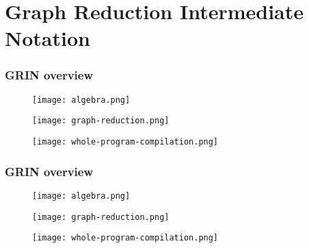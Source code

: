 \documentclass[bigger,aspectratio=169]{beamer}
\begin{document}
\section{Graph Reduction Intermediate Notation}

\begin{frame}[fragile]
\frametitle{GRIN overview}
\begin{center}

	\begin{minipage}{0.30\textwidth}
		\begin{figure}
			\texttt{[image: algebra.png]}
		\end{figure}
	\end{minipage}
	\hfill
	\pause
	\begin{minipage}{0.30\textwidth}
		\begin{figure}
			\texttt{[image: graph-reduction.png]}
		\end{figure}
	\end{minipage}
	\hfill
	\pause
	\begin{minipage}{0.30\textwidth}
		\begin{figure}
			\texttt{[image: whole-program-compilation.png]}
		\end{figure}
	\end{minipage}

\end{center}
\end{frame}

\begin{frame}[fragile]
\frametitle{GRIN overview}
\begin{center}

	\begin{minipage}{0.30\textwidth}
		\begin{figure}
			\texttt{[image: algebra.png]}
		\end{figure}
	\end{minipage}
	\hfill
	\begin{minipage}{0.30\textwidth}
		\begin{figure}
			\texttt{[image: graph-reduction.png]}
		\end{figure}
	\end{minipage}
	\hfill
	\begin{minipage}{0.30\textwidth}
		\begin{figure}
			\texttt{[image: whole-program-compilation.png]}
		\end{figure}
	\end{minipage}

\end{center}
\end{frame}
\end{document}
